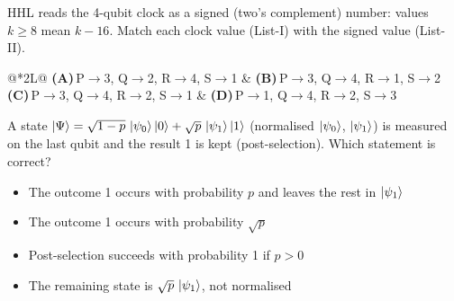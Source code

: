 \documentclass[11pt,a4paper]{article}
\newcommand{\optlabel}[1]{\textbf{(#1)}}
\newenvironment{qitem}[1]{\begin{list}{}{\setlength{\leftmargin}{3.3em}\setlength{\labelwidth}{3.1em}%
  \setlength{\labelsep}{0.2em}\setlength{\topsep}{3pt}\setlength{\parsep}{3pt}}\item[\textbf{Q.#1}\hfill]}{\end{list}}
\newcommand{\qsep}{\par\vspace{2pt}{\color{black!15}\hrule}\vspace{4pt}}
\begin{document}
\begin{qitem}{30}
HHL reads the 4-qubit clock as a signed (two's complement) number: values $k \ge 8$ mean $k - 16$. Match each clock value (List-I) with the signed value
(List-II).
\par\smallskip{}
\par\smallskip\noindent\begin{tabularx}{\linewidth}{@{}*{2}{L}@{}}
\optlabel{A}\,P$\to$3, Q$\to$2, R$\to$4, S$\to$1 & \optlabel{B}\,P$\to$3, Q$\to$4, R$\to$1, S$\to$2 \\[3pt]
\optlabel{C}\,P$\to$3, Q$\to$4, R$\to$2, S$\to$1 & \optlabel{D}\,P$\to$1, Q$\to$4, R$\to$2, S$\to$3
\end{tabularx}
\end{qitem}
\qsep

\begin{qitem}{31}
A state $\ket\Psi = \sqrt{1 - p}\,\ket{\psi_0}\ket0 + \sqrt p\,\ket{\psi_1}\ket1$ (normalised $\ket{\psi_0}$, $\ket{\psi_1}$) is measured on the last qubit and the result 1 is kept (post-selection).
Which statement is correct?
\begin{itemize}[leftmargin=2.6em, labelsep=0.4em, itemsep=2pt, topsep=3pt]
\item[\optlabel{A}] The outcome 1 occurs with probability $p$ and leaves the rest in $\ket{\psi_1}$
\item[\optlabel{B}] The outcome 1 occurs with probability $\sqrt p$
\item[\optlabel{C}] Post-selection succeeds with probability 1 if $p > 0$
\item[\optlabel{D}] The remaining state is $\sqrt p\,\ket{\psi_1}$, not normalised
\end{itemize}
\end{qitem}
\qsep
\end{document}

